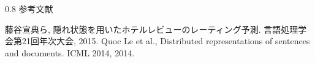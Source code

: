 \documentclass[unicode,10pt]{beamer}
\newlength{\mycolumnwidth}
\begin{document}
\begin{frame}
\begin{columns}[onlytextwidth,t]
\begin{column}{0.8\mycolumnwidth}
    参考文献
    
    \begin{thebibliography}{9}
      藤谷宣典ら,
      隠れ状態を用いたホテルレビューのレーティング予測.
      言語処理学会第21回年次大会, 2015.
      Quoc Le et al.,
      Distributed representations of sentences and documents.
      ICML 2014, 2014.
    \end{thebibliography}
  \end{column}
\end{columns}

\end{frame}
\end{document}
